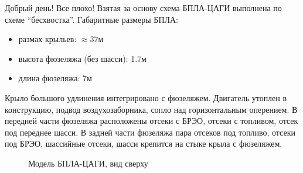 Добрый день! Все плохо! 
Взятая за основу схема БПЛА-ЦАГИ выполнена по схеме ``бесхвостка''. Габаритные размеры БПЛА: 
\begin{itemize}
\item размах крыльев: $\approx37\text{м}$
\item высота фюзеляжа (без шасси): 1.7м
\item длина фюзеляжа: 7м
\end{itemize}


Крыло большого удлинения интегрировано с фюзеляжем. Двигатель утоплен в конструкцию, подвод воздухозаборника, сопло над горизонтальным оперением. В передней части фюзеляжа расположены отсеки с БРЭО, отсеки с топливом, отсек под переднее шасси. 
В задней части фюзеляжа пара отсеков под топливо, отсеки под БРЭО, шассийные отсеки, шасси крепится на стыке крыла с фюзеляжем. 

\begin{figure}
\caption{Модель БПЛА-ЦАГИ, вид сверху}
\label{fig:BPS_topview}
\end{figure}


